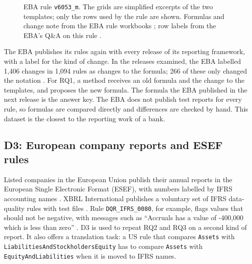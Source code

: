 \documentclass[11pt,a4paper]{article}
\let\oldsubsection\subsection
\renewcommand{\subsection}{\FloatBarrier\oldsubsection}
\begin{document}
\begin{figure}[htb]
\caption{EBA rule \texttt{v6053\_m}. The grids are simplified excerpts of the two templates; only the rows used by the rule are shown. Formulas and change note from the EBA rule workbooks \cite{eba}; row labels from the EBA's Q\&A on this rule \cite{ebaqa}.}
\label{fig:eba}
\end{figure}

The EBA publishes its rules again with every release of its reporting framework, with a label for the kind of change. In the releases examined, the EBA labelled 1,406 changes in 1,094 rules as changes to the formula; 266 of these only changed the notation \cite{pilotb}. For RQ1, a method receives an old formula and the change to the templates, and proposes the new formula. The formula the EBA published in the next release is the answer key. The EBA does not publish test reports for every rule, so formulas are compared directly and differences are checked by hand. This dataset is the closest to the reporting work of a bank.

\subsection{D3: European company reports and ESEF rules}
\label{sec:d3}

Listed companies in the European Union publish their annual reports in the European Single Electronic Format (ESEF), with numbers labelled by IFRS accounting names \cite{esma}. XBRL International publishes a voluntary set of IFRS data-quality rules with test files \cite{esefdqr,dqrconf}. Rule \texttt{DQR\_IFRS\_0080}, for example, flags values that should not be negative, with messages such as ``Accruals has a value of -400,000 which is less than zero'' \cite{dqcifrs0080}. D3 is used to repeat RQ2 and RQ3 on a second kind of report. It also offers a translation task: a US rule that compares \texttt{Assets} with \texttt{LiabilitiesAndStockholdersEquity} has to compare \texttt{Assets} with \texttt{EquityAndLiabilities} when it is moved to IFRS names.
\end{document}
